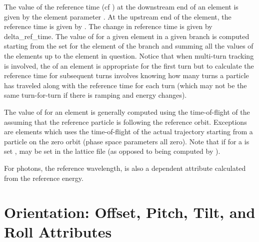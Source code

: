 The value of the reference time (cf ) at the downstream end of an element is given by the
element parameter . At the upstream end of the element, the reference time is given by
. The change in reference time is given by {delta_ref_time}. The value of
 for a given element in a given branch is computed starting from the  set
for the  element of the branch and summing all the  values of the
elements up to the element in question. Notice that when multi-turn tracking is involved, the 
of an element is appropriate for the first turn but to calculate the reference time for subsequent turns
involves knowing how many turns a particle has traveled along with the reference time for each turn (which
may not be the same turn-for-turn if there is ramping and energy changes).

The value of  for an element is generally computed using the time-of-flight of
the  assuming that the reference particle is following the reference
orbit. Exceptions are  elements which uses the time-of-flight of the actual trajectory
starting from a particle on the zero orbit (phase space parameters all zero). Note that if
 for a  is set ,  may be set
in the lattice file (as opposed to being computed by \bmad).

For photons, the reference wavelength,  is also a dependent attribute calculated
from the reference energy.

\vfill

\section{Orientation: Offset, Pitch, Tilt, and Roll Attributes}
\label{s:offset}

